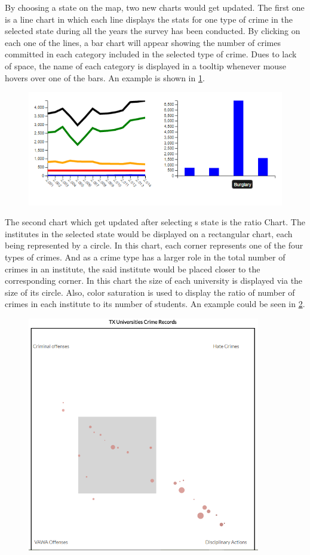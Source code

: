 \documentclass[12pt]{article}
\begin{document}
By choosing a state on the map, two new charts would get updated. The first one is a line chart in which each line displays the stats for one type of crime in the selected state during all the years the survey has been conducted. By clicking on each one of the lines, a bar chart will appear showing the number of crimes committed in each category included in the selected type of crime. Dues to lack of space, the name of each category is displayed in a tooltip whenever mouse hovers over one of the bars. An example is shown in \cref{fig:charts}.
\begin{figure}[H]
   \centering{}
	       \includegraphics[width=5in]{chart.PNG}           
\caption{}
\label{fig:charts}
\end{figure}

The second chart which get updated after selecting s state is the ratio Chart. The institutes in the selected state would be displayed on a rectangular chart, each being represented by a circle. In this chart, each corner represents one of the four types of crimes. And as a crime type has a larger role in the total number of crimes in an institute, the said institute would be placed closer to the corresponding corner. In this chart the size of each university is displayed via the size of its circle. Also, color saturation is used to display the ratio of number of crimes in each institute to its number of students. An example could be seen in \cref{fig:ratio}.

\begin{figure}[H]
   \centering{}
	       \includegraphics[width=4in]{ratio.PNG}           
\caption{}
\label{fig:ratio}
\end{figure}
\end{document}
